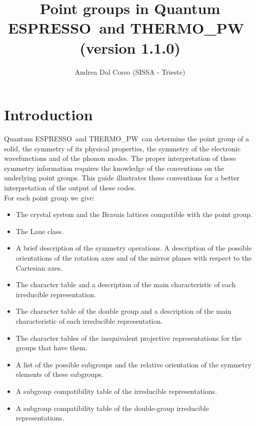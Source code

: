 \documentclass[12pt,a4paper]{article}
\def\version{1.1.0}
\def\qe{{\sc Quantum ESPRESSO}}
\def\tpw{{\sc THERMO\_PW}}
\begin{document}
 
\author{Andrea Dal Corso (SISSA - Trieste)}
\date{}


\title{
  \vskip 1cm
  {\color{red}\Huge Point groups in \qe\ and \tpw\ }
  \Large (version \version)
}

\maketitle

\tableofcontents

\newpage
\section{\color{coral}Introduction}
\qe\ and \tpw\ can determine the point group of a
solid, the symmetry of its physical properties, the symmetry
of the electronic wavefunctions and of the phonon modes. The proper interpretation
of these symmetry information requires the knowledge of the conventions on the 
underlying point groups. This guide illustrates these conventions
for a better interpretation of the output of these codes. \\
For each point group we give: 
\begin{itemize}

\item
The crystal system and the Bravais lattices compatible with the point
group.

\item
The Laue class.

\item
A brief description of the symmetry operations. 
A description of the possible orientations of the rotation axes and of the 
mirror planes with respect to the Cartesian axes.

\item
The character table and a description of the main characteristic of each 
irreducible representation.

\item
The character table of the double group and a description of the main 
characteristic of each irreducible representation.

\item
The character tables of the inequivalent projective representations for the 
groups that have them.

\item
A list of the possible subgroups and the relative orientation of the symmetry
elements of these subgroups.

\item
A subgroup compatibility table of the irreducible representations.

\item
A subgroup compatibility table of the double-group irreducible representations. 

\end{itemize}
\end{document}
